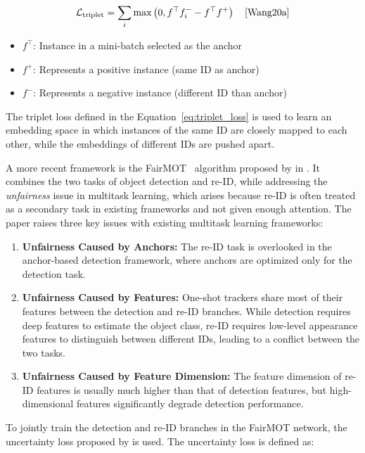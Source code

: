 \begin{equation}
	\label{eq:triplet_loss}
	\mathcal{L}_{\text{triplet}}=\sum_i \max \left(0, f^{\top} f_i^{-}-f^{\top} f^{+}\right)
	\quad\text{\cite[Eq.~1]{Wang20a}}
\end{equation}

\begin{itemize}
	\item \(f^{\top}\): Instance in a mini-batch selected as the anchor
	\item \(f^{+}\): Represents a positive instance (same ID as anchor)
	\item \(f^{-}\): Represents a negative instance (different ID than anchor)
\end{itemize}

The triplet loss defined in the Equation~\ref{eq:triplet_loss} is used to learn an embedding space in which instances of the same ID are closely mapped to each other, while the embeddings of different IDs are pushed apart.

A more recent framework is the FairMOT~\cite{Zhang21} algorithm proposed by \citeauthor{Zhang21} in \citeyear{Zhang21}. It combines the two tasks of object detection and re-ID, while addressing the \textit{unfairness} issue in multitask learning, which arises because re-ID is often treated as a secondary task in existing frameworks and not given enough attention. The paper raises three key issues with existing multitask learning frameworks:

\begin{enumerate}
	\item \textbf{Unfairness Caused by Anchors:} The re-ID task is overlooked in the anchor-based detection framework, where anchors are optimized only for the detection task.
	\item \textbf{Unfairness Caused by Features:} One-shot trackers share most of their features between the detection and re-ID branches. While detection requires deep features to estimate the object class, re-ID requires low-level appearance features to distinguish between different IDs, leading to a conflict between the two tasks.
	\item \textbf{Unfairness Caused by Feature Dimension:} The feature dimension of re-ID features is usually much higher than that of detection features, but high-dimensional features significantly degrade detection performance.
\end{enumerate}

To jointly train the detection and re-ID branches in the FairMOT network, the uncertainty loss proposed by \textcite{Cipolla18} is used. The uncertainty loss is defined as:

